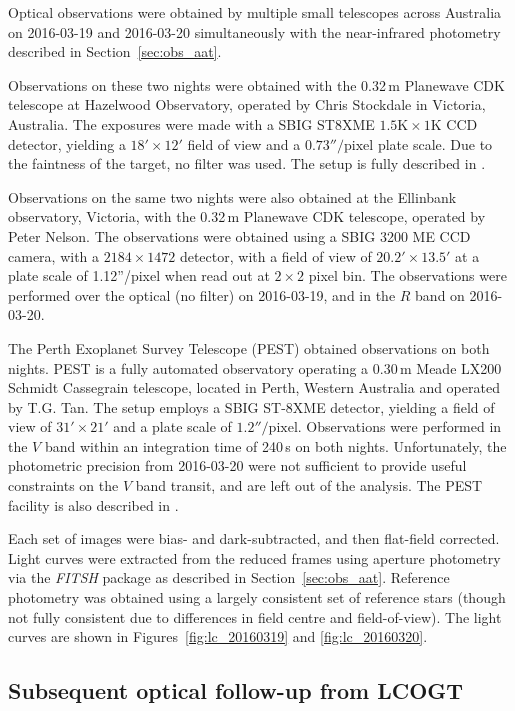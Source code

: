 \documentclass[useAMS,usenatbib]{mn2e}
\begin{document}
Optical observations were obtained by multiple small telescopes across Australia on 2016-03-19 and 2016-03-20 simultaneously with the near-infrared photometry described in Section~\ref{sec:obs_aat}. 

Observations on these two nights were obtained with the 0.32\,m Planewave CDK telescope at Hazelwood Observatory, operated by Chris Stockdale in Victoria, Australia. The exposures were made with a SBIG ST8XME $1.5\mathrm{K}\times1 \mathrm{K}$ CCD detector, yielding a $18'\times12'$ field of view and a $0.73''/\mathrm{pixel}$ plate scale. Due to the faintness of the target, no filter was used. The setup is fully described in \citet{2015arXiv150908953R}.

Observations on the same two nights were also obtained at the Ellinbank observatory, Victoria, with the 0.32\,m Planewave CDK telescope, operated by Peter Nelson. The observations were obtained using a SBIG 3200 ME CCD camera, with a $2184\times1472$ detector, with a field of view of $20.2' \times 13.5'$ at a plate scale of 1.12''/pixel when read out at $2\times 2$ pixel bin. The observations were performed over the optical (no filter) on 2016-03-19, and in the $R$ band on 2016-03-20. 

The Perth Exoplanet Survey Telescope (PEST) obtained observations on both nights. PEST is a fully automated observatory operating a 0.30\,m Meade LX200 Schmidt Cassegrain telescope, located in Perth, Western Australia and operated by T.G. Tan. The setup employs a SBIG ST-8XME detector, yielding a field of view of $31'\times 21'$ and a plate scale of $1.2''/\mathrm{pixel}$. Observations were performed in the $V$ band within an integration time of 240\,s on both nights. Unfortunately, the photometric precision from 2016-03-20 were not sufficient to provide useful constraints on the $V$ band transit, and are left out of the analysis. The PEST facility is also described in \citet{2015arXiv150908953R}.

Each set of images were bias- and dark-subtracted, and then flat-field corrected. Light curves were extracted from the reduced frames using aperture photometry via the \emph{FITSH} package as described in Section~\ref{sec:obs_aat}. Reference photometry was obtained using a largely consistent set of reference stars (though not fully consistent due to differences in field centre and field-of-view). The light curves are shown in Figures~\ref{fig:lc_20160319} and \ref{fig:lc_20160320}. 


\subsection{Subsequent optical follow-up from LCOGT}
\label{sec:lcogt}
\end{document}
